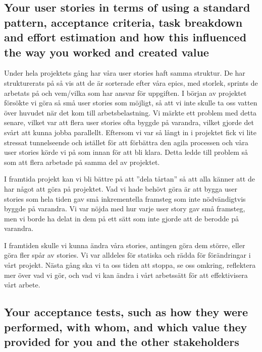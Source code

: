\documentclass{scrartcl}
\begin{document}


\subsection{Your user stories in terms of using a standard pattern, acceptance criteria, task breakdown and effort estimation and how this influenced the way you worked and created value}


Under hela projektets gång har våra user stories haft samma struktur. De har strukturerats på så vis att de är sorterade efter våra epics, med storlek, sprints de arbetats på och vem/vilka som har ansvar för uppgiften.
I början av projektet försökte vi göra så små user stories som möjligt, så att vi inte skulle ta oss vatten över huvudet när det kom till arbetsbelastning. Vi märkte ett problem med detta senare, vilket var att flera user stories ofta byggde på varandra, vilket gjorde det svårt att kunna jobba parallellt. Eftersom vi var så långt in i projektet fick vi lite stressat tunnelseende och istället för att förbättra den agila processen och våra user stories körde vi på som innan för att bli klara. Detta ledde till problem så som att flera arbetade på samma del av projektet.

I framtida projekt kan vi bli bättre på att ''dela tårtan'' så att alla känner att de har något att göra på projektet.
Vad vi hade behövt göra är att bygga user stories som hela tiden gav små inkrementella framsteg som inte nödvändigtvis byggde på varandra. Vi var nöjda med hur varje user story gav små framsteg, men vi borde ha delat in dem på ett sätt som inte gjorde att de berodde på varandra. 

I framtiden skulle vi kunna ändra våra stories, antingen göra dem större, eller göra fler spår av stories. Vi var alldeles för statiska och rädda för förändringar i vårt projekt. Nästa gång ska vi ta oss tiden att stoppa, se oss omkring, reflektera mer över vad vi gör, och vad vi kan ändra i vårt arbetssätt för att effektivisera vårt arbete.



\subsection{Your acceptance tests, such as how they were performed, with whom, and which value they provided for you and the other stakeholders}\label{sec:acceptance-tests}
\end{document}
